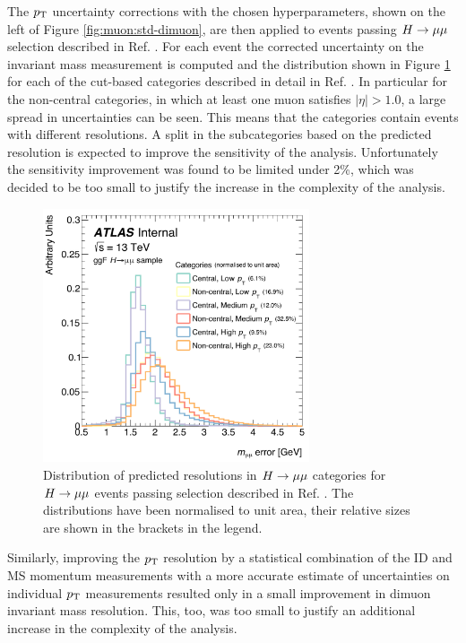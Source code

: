The $p_{\text{T}}$ uncertainty corrections with the chosen hyperparameters,
shown on the left of Figure \ref{fig:muon:std-dimuon}, are then applied
to events passing $\hmumu$ selection described in Ref.
\cite{ATLAS-CONF-2018-026}. For each event the corrected uncertainty
on the invariant mass measurement is computed and the distribution
shown in Figure \ref{fig:muon:hmumu} for each of the cut-based categories
described in detail in Ref. \cite{ATLAS-CONF-2018-026}. In particular for
the non-central categories, in which at least one muon satisfies
$|\eta| > 1.0$, a large spread in uncertainties can be seen. This means
that the categories contain events with different resolutions. A split in
the subcategories based on the predicted resolution is expected to
improve the sensitivity of the analysis. Unfortunately the sensitivity
improvement was found to be limited under 2\%, which was decided
to be too small to justify the increase in the complexity of the analysis.
\begin{figure}[h!]
  \centering
  \includegraphics[width=0.7\textwidth]{figures/muons/vader-hmumu}
  \caption[Distribution of predicted resolutions in $\hmumu$ categories]
  {Distribution of predicted resolutions in $\hmumu$ categories for
  \ggf~$\hmumu$ events passing selection described in Ref.
  \cite{ATLAS-CONF-2018-026}. The distributions have been normalised
  to unit area, their relative sizes are shown in the brackets in
  the legend.
  }
  \label{fig:muon:hmumu}
\end{figure}

Similarly, improving the $p_{\text{T}}$ resolution by a statistical combination
of the ID and MS momentum measurements with a more accurate estimate
of uncertainties on individual $p_{\text{T}}$ measurements resulted only in a small
improvement in dimuon invariant mass resolution. This, too, was too small
to justify an additional increase in the complexity of the analysis.





